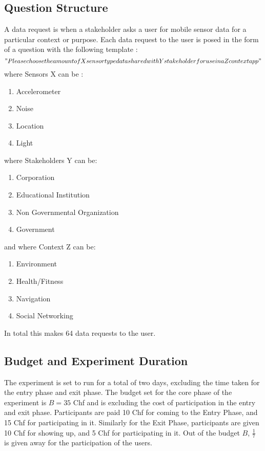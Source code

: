 \subsection{Question Structure}

A data request is when a stakeholder asks a user for mobile sensor data for a particular context or purpose. Each data request to the user is posed in the form of a question with the following template :
$$"Please choose the amount of X sensor type data shared with Y stakeholder for use in a Z context app"$$
where Sensors X can be :
\begin{enumerate}
    \item Accelerometer
    \item Noise
    \item Location
    \item Light
\end{enumerate}
where Stakeholders Y can be:
\begin{enumerate}
    \item Corporation
    \item Educational Institution
    \item Non Governmental Organization
    \item Government
\end{enumerate}
and where Context Z can be:
\begin{enumerate}
    \item Environment
    \item Health/Fitness
    \item Navigation
    \item Social Networking
\end{enumerate}

In total this makes 64 data requests to the user.

\subsection{Budget and Experiment Duration}
The experiment is set to run for a total of two days, excluding the time taken for the entry phase and exit phase.
The budget set for the core phase of the experiment is $B=35$ Chf and is excluding the cost of participation
in the entry and exit phase. Participants are paid 10 Chf for coming to the Entry Phase, and 15 Chf for
participating in it. Similarly for the Exit Phase, participants are given 10 Chf for showing up, and 5 Chf for participating in it.
Out of the budget $B$, $\frac{1}{7}$ is given away for the participation of the users.


